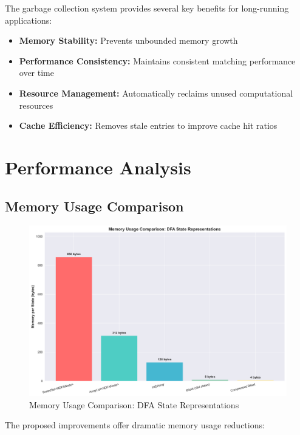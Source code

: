 \documentclass[11pt,a4paper]{article}
\begin{document}
The garbage collection system provides several key benefits for long-running applications:

\begin{itemize}
    \item \textbf{Memory Stability:} Prevents unbounded memory growth
    \item \textbf{Performance Consistency:} Maintains consistent matching performance over time
    \item \textbf{Resource Management:} Automatically reclaims unused computational resources
    \item \textbf{Cache Efficiency:} Removes stale entries to improve cache hit ratios
\end{itemize}

\section{Performance Analysis}

\subsection{Memory Usage Comparison}

\begin{figure}[H]
\centering
\includegraphics[width=\textwidth]{illustrations/memory_usage_comparison.png}
\caption{Memory Usage Comparison: DFA State Representations}
\label{fig:memory_comparison}
\end{figure}

The proposed improvements offer dramatic memory usage reductions:
\end{document}
